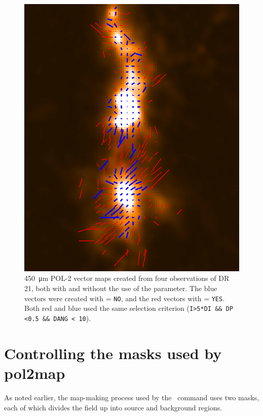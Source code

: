 \begin{figure}[ht!]
\begin{center}
\includegraphics[width=0.7\linewidth]{sc22-smooth450-450nosmo-1.png}
\caption [Example vector map showing the effect of the \poltwomap\  parameter.]{
  \SI{450}{\micro\metre} POL-2 vector maps created from four observations of
  DR\,21, both with and without the use of the  parameter. The blue
  vectors were created with  = \texttt{NO}, and the red vectors with
   = \texttt{YES}. Both red and blue used the same selection criterion
  (\texttt{I>5*DI \&\& DP <0.5 \&\& DANG < 10}).
\label{fig:smooth450map}
}
\end{center}
\end{figure}


\section{Controlling the masks used by pol2map}

As noted earlier, the map-making process used by the \poltwomap\ command uses
two masks, each of which divides the field up into source and background
regions.


